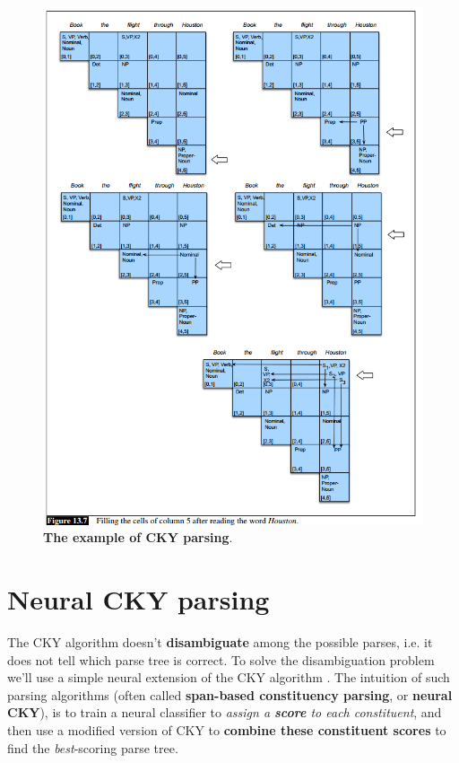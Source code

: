 \documentclass[11pt]{article}
\begin{document}
\begin{figure}
\begin{minipage}[t]{1\linewidth}
  \centering
  \centerline{\includegraphics[scale = 0.5]{cky_parsing.png}}
\end{minipage}
\caption{\footnotesize{\textbf{The example of CKY parsing}.}}
\label{fig: cky_parse}
\end{figure}

\section{Neural CKY parsing}
The CKY algorithm doesn't \textbf{disambiguate} among the possible parses, i.e. it does not tell which parse tree is correct. To solve the disambiguation problem we’ll use a simple neural extension of the CKY algorithm \citep{kitaev2018constituency}. The intuition of such parsing algorithms (often called \textbf{span-based constituency parsing}, or \textbf{neural CKY}), is to train a neural classifier to \emph{assign a \textbf{score} to each constituent}, and then use a modified version of CKY to \textbf{combine these constituent scores} to find the \textit{best}-scoring parse tree.
\end{document}
